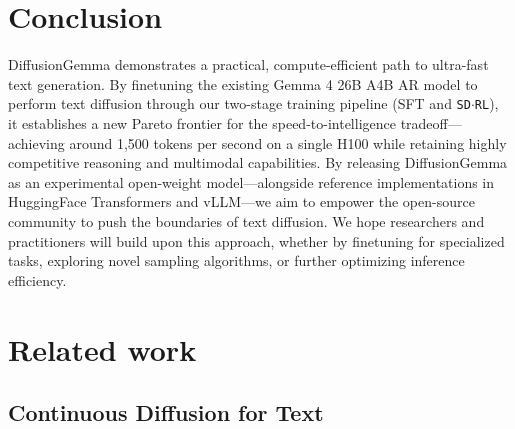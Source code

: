 \documentclass[11pt, a4paper, logo, copyright, gdm]{google}
\newcommand{\sdrl}{\texttt{{\small SD$\cdot$RL}}\xspace}
\begin{document}
\section{Conclusion} \label{sec:conclusion}
DiffusionGemma demonstrates a practical, compute-efficient path to ultra-fast text generation. By finetuning the existing Gemma 4 26B A4B AR model to perform text diffusion through our two-stage training pipeline (SFT and \sdrl), it establishes a new Pareto frontier for the speed-to-intelligence tradeoff---achieving around 1,500 tokens per second on a single H100 while retaining highly competitive reasoning and multimodal capabilities. By releasing DiffusionGemma as an experimental open-weight model---alongside reference implementations in HuggingFace Transformers and vLLM---we aim to empower the open-source community to push the boundaries of text diffusion. We hope researchers and practitioners will build upon this approach, whether by finetuning for specialized tasks, exploring novel sampling algorithms, or further optimizing inference efficiency.



\newpage

\appendix



\newpage

\section{Related work} \label{sec:related_work}

\subsection{Continuous Diffusion for Text}
\end{document}
